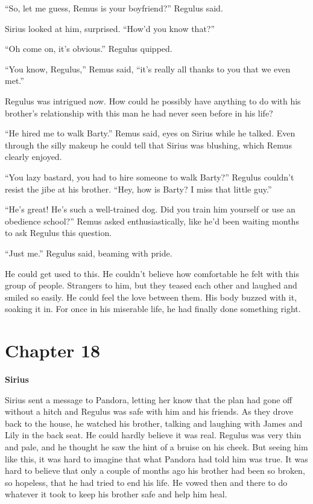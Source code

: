 \documentclass[12pt,twoside,openright]{memoir}
\begin{document}
``So, let me guess, Remus is your boyfriend?'' Regulus said.

Sirius looked at him, surprised. ``How'd you know that?''

``Oh come on, it's obvious.'' Regulus quipped.

``You know, Regulus,'' Remus said, ``it's really all thanks to you that we even met.''

Regulus was intrigued now. How could he possibly have anything to do with his brother's relationship with this man he had never seen before in his life?

``He hired me to walk Barty.'' Remus said, eyes on Sirius while he talked. Even through the silly makeup he could tell that Sirius was blushing, which Remus clearly enjoyed. 

``You lazy bastard, you had to hire someone to walk Barty?'' Regulus couldn't resist the jibe at his brother. ``Hey, how is Barty? I miss that little guy.''

``He's great! He's such a well-trained dog. Did you train him yourself or use an obedience school?'' Remus asked enthusiastically, like he'd been waiting months to ask Regulus this question.

``Just me.'' Regulus said, beaming with pride. 

He could get used to this. He couldn't believe how comfortable he felt with this group of people. Strangers to him, but they teased each other and laughed and smiled so easily. He could feel the love between them. His body buzzed with it, soaking it in. For once in his miserable life, he had finally done something right.

\chapter{Chapter 18}

\textbf{Sirius} 

Sirius sent a message to Pandora, letting her know that the plan had gone off without a hitch and Regulus was safe with him and his friends. As they drove back to the house, he watched his brother, talking and laughing with James and Lily in the back seat. He could hardly believe it was real. Regulus was very thin and pale, and he thought he saw the hint of a bruise on his cheek. But seeing him like this, it was hard to imagine that what Pandora had told him was true. It was hard to believe that only a couple of months ago his brother had been so broken, so hopeless, that he had tried to end his life. He vowed then and there to do whatever it took to keep his brother safe and help him heal.
\end{document}

